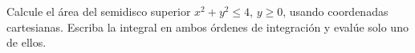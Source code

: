 Calcule el área del semidisco superior $x^2+y^2\leq4$, $y\geq0$, usando coordenadas cartesianas. Escriba la integral en ambos órdenes de integración y evalúe solo uno de ellos.
